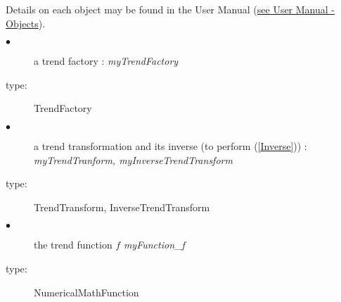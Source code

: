 Details on each object may be found in the User Manual  (\href{OpenTURNS_UserManual_TUI.pdf}{see User Manual - Objects}).\\

 
{

  \begin{description}
  \item[$\bullet$] a trend factory : {\itshape myTrendFactory}
  \item[type:]  TrendFactory
  \end{description}

  \begin{description}
  \item[$\bullet$] a trend transformation  and its inverse (to perform (\ref{Inverse})) : {\itshape myTrendTranform, myInverseTrendTransform}
  \item[type:]  TrendTransform, InverseTrendTransform
  \end{description}

  \begin{description}
  \item[$\bullet$] the trend function $f$ {\itshape myFunction\_f}
  \item[type:]  NumericalMathFunction 
  \end{description}

}

